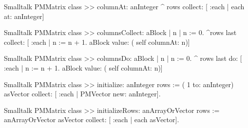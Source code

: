 \begin{displaycode}{Smalltalk}
PMMatrix class >> columnAt: anInteger
    ^ rows collect: [ :each | each at: anInteger]
\end{displaycode}

\begin{displaycode}{Smalltalk}
PMMatrix class >> columnsCollect: aBlock
    | n |
    n := 0.
    ^rows last collect: [ :each | n := n + 1. aBlock value: ( self 
                                                         columnAt: n)]
\end{displaycode}

\begin{displaycode}{Smalltalk}
PMMatrix class >> columnsDo: aBlock
    | n |
    n := 0.
    ^ rows last do: [ :each | n := n + 1. aBlock value: ( self 
                                                         columnAt: n)]
\end{displaycode}

\begin{displaycode}{Smalltalk}
PMMatrix class >> initialize: anInteger
    rows := ( 1 to: anInteger) asVector collect: [ :each | PMVector 
                                                      new: anInteger].
\end{displaycode}

\begin{displaycode}{Smalltalk}
PMMatrix class >> initializeRows: anArrayOrVector
    rows := anArrayOrVector asVector collect: [ :each | each 
                                                            asVector].
\end{displaycode}

